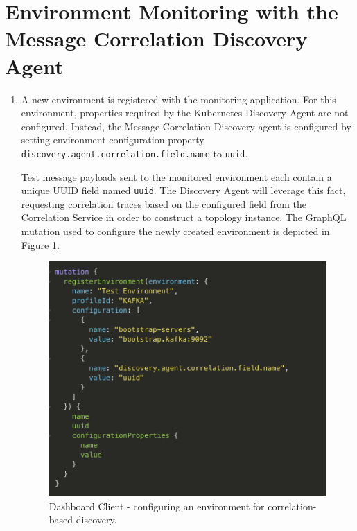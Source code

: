 \section{Environment Monitoring with the Message Correlation Discovery Agent}

\begin{enumerate}
	
	\item A new environment is registered with the monitoring application. For this environment, properties required by the Kubernetes Discovery Agent are not configured. Instead, the Message Correlation Discovery agent is configured by setting environment configuration property \texttt{discovery.agent.correlation.field.name} to \texttt{uuid}. 
	
	Test message payloads sent to the monitored environment each contain a unique UUID field named \texttt{uuid}. The Discovery Agent will leverage this fact, requesting correlation traces based on the configured field from the Correlation Service in order to construct a topology instance. The GraphQL mutation used to configure the newly created environment is depicted in Figure  \ref{reg_env_correlation}.
	
	\vspace{5mm}
		 
\begin{figure}[H]
	\centering  
	\includegraphics[scale=0.7]{figures/walkthrough/correlation_env.png}
	\caption{Dashboard Client - configuring an environment for correlation-based discovery.}
	\label{reg_env_correlation}
\end{figure}


\end{enumerate}
